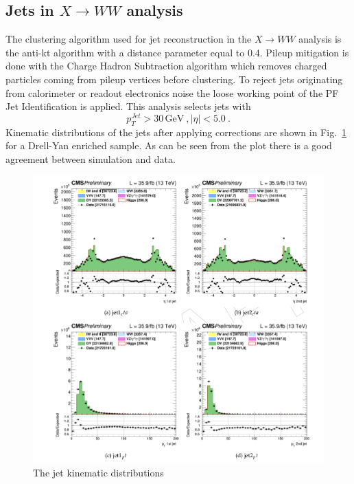 \subsection*{Jets in $X \to WW$ analysis}
The clustering algorithm used for jet reconstruction in the $X \to WW$ analysis is the anti-kt algorithm with
a distance parameter equal to 0.4. Pileup mitigation is done with the Charge Hadron Subtraction  algorithm 
which removes charged particles coming from pileup vertices before
clustering.
To reject jets originating
from calorimeter or readout electronics noise the loose working point of the PF Jet Identification is applied. 
This analysis selects jets with
\begin{equation}
 p_T^{Jet} > 30 \, \mathrm{GeV} \: , |\eta| < 5.0 \: .
\end{equation}
Kinematic distributions of the jets after applying corrections are shown in Fig.~\ref{jetFig} for a Drell-Yan enriched sample.  As can be seen from the plot there is a good agreement between simulation and data.
\begin{figure}
\centering
\includegraphics[scale= 0.5]{../Cap4/jetFig}
\caption{The jet kinematic distributions}
\label{jetFig}
\end{figure}

